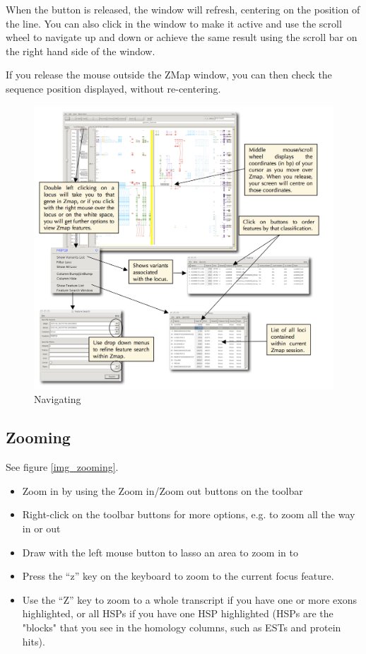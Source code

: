 \documentclass[letterpaper]{article}
\begin{document}
When the button is released, the window will refresh, centering on the position of the line. You can also click in the window to make it active and use the scroll wheel to navigate up and down or achieve the same result using the scroll bar on the right hand side of the window.

If you release the mouse outside the ZMap window, you can then check the sequence position displayed, without re-centering.

\begin{figure}
\centering
\color[rgb]{0.30980393,0.5058824,0.7411765}
\includegraphics[width=15.231cm]{img_navigating.png}
\caption{Navigating}
\label{img_navigating}
\end{figure}


\subsection{Zooming} \label{sec_zooming}
See figure \ref{img_zooming}.

\begin{itemize}
\item Zoom in by using the Zoom in/Zoom out buttons on the toolbar
\item Right-click on the toolbar buttons for more options, e.g. to zoom all the way in or out
\item Draw with the left mouse button to lasso an area to zoom in to
\item Press the ``z'' key on the keyboard to zoom to the current focus feature.
\item Use the ``Z'' key to zoom to a whole transcript if you have one or more exons highlighted, or all HSPs if you have one HSP highlighted (HSPs are the "blocks" that you see in the homology columns, such as ESTs and protein hits). 
\end{itemize}
\end{document}
